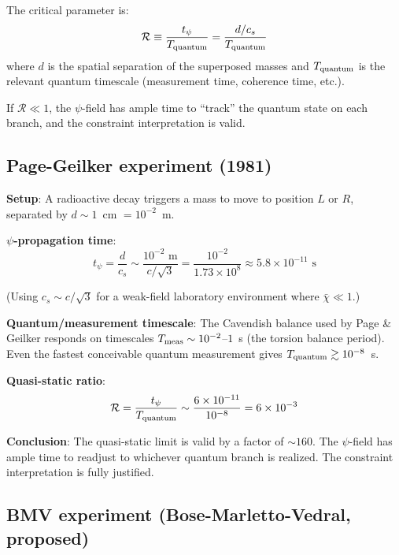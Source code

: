 \documentclass[12pt,a4paper]{article}
\begin{document}
The critical parameter is:
\begin{equation}
\mathcal{R} \equiv \frac{t_\psi}{T_{\rm quantum}}
= \frac{d/c_s}{T_{\rm quantum}}
\end{equation}
where $d$ is the spatial separation of the superposed masses and
$T_{\rm quantum}$ is the relevant quantum timescale (measurement time,
coherence time, etc.).

If $\mathcal{R} \ll 1$, the $\psi$-field has ample time to ``track'' the
quantum state on each branch, and the constraint interpretation is valid.

\subsection{Page-Geilker experiment (1981)}

\begin{tcolorbox}[colback=blue!5!white, colframe=blue!60!black,
title=Page-Geilker: Quasi-Static Assessment]
\textbf{Setup}: A radioactive decay triggers a mass to move to position $L$
or $R$, separated by $d \sim 1$~cm $= 10^{-2}$~m.

\textbf{$\psi$-propagation time}:
\begin{equation}
t_\psi = \frac{d}{c_s} \sim \frac{10^{-2}\text{ m}}{c/\sqrt{3}}
= \frac{10^{-2}}{1.73 \times 10^8} \approx 5.8 \times 10^{-11}\text{ s}
\end{equation}

(Using $c_s \sim c/\sqrt{3}$ for a weak-field laboratory environment where
$\bar\chi \ll 1$.)

\textbf{Quantum/measurement timescale}: The Cavendish balance used by
Page \& Geilker responds on timescales $T_{\rm meas} \sim 10^{-2}$--$1$~s
(the torsion balance period). Even the fastest conceivable quantum measurement
gives $T_{\rm quantum} \gtrsim 10^{-8}$~s.

\textbf{Quasi-static ratio}:
\begin{equation}
\mathcal{R} = \frac{t_\psi}{T_{\rm quantum}}
\sim \frac{6 \times 10^{-11}}{10^{-8}} = 6 \times 10^{-3}
\end{equation}

\textbf{Conclusion}: The quasi-static limit is valid by a factor of $\sim
160$. The $\psi$-field has ample time to readjust to whichever quantum branch
is realized. The constraint interpretation is fully justified.
\end{tcolorbox}

\subsection{BMV experiment (Bose-Marletto-Vedral, proposed)}
\end{document}
